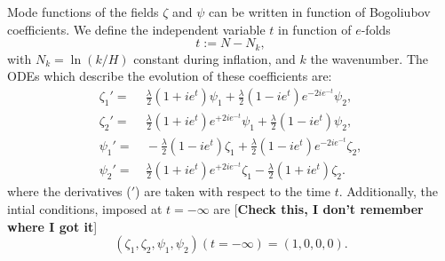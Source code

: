 \documentclass[
 aip,
 jmp,
 amsmath,amssymb,
 reprint,
 nofootinbib,
]{revtex4-2}
\begin{document}
Mode functions of the fields $\zeta$ and $\psi$ can be written in function of Bogoliubov coefficients. We define the independent variable $t$ in function of $e$-folds
\begin{equation}
    t:=N-N_k,
\end{equation}
with  $N_k=\ln{(k/H)}$ constant during inflation, and $k$ the wavenumber. The ODEs which describe the evolution of these coefficients are:
\begin{equation}\label{Bogo}
\begin{aligned}
    \zeta_1'= &~{} \frac{\lambda}{2}\left(1+i e^{t}\right)\psi_1 + \frac{\lambda}{2}\left(1-i e^{t}\right)e^{-2i e^{-t}}\psi_2, \\
    \zeta_2'= &~{}  \frac{\lambda}{2}\left(1+i e^{t}\right)e^{+2i e^{-t}}\psi_1 + \frac{\lambda}{2}\left(1-i e^{t}\right)\psi_2, \\
    \psi_1'= &~{}  -\frac{\lambda}{2}\left(1-i e^{t}\right)\zeta_1 + \frac{\lambda}{2}\left(1-i e^{t}\right)e^{-2i e^{-t}}\zeta_2, \\
    \psi_2'=&~{}  \frac{\lambda}{2}\left(1+i e^{t}\right)e^{+2i e^{-t}}\zeta_1 - \frac{\lambda}{2}\left(1+i e^{t}\right)\zeta_2.
\end{aligned}
\end{equation}
where the derivatives ($'$) are taken with respect to the time $t$. Additionally, the intial conditions, imposed at $t = - \infty$ are [\textbf{Check this, I don't remember where I got it}]
\begin{equation}
    (\zeta_1, \zeta_2, \psi_1, \psi_2)(t=-\infty) = (1,0,0,0).
\end{equation}
\end{document}

